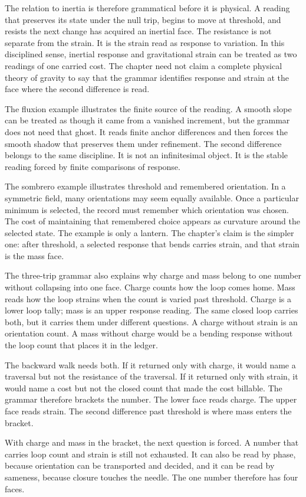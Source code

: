 The relation to inertia is therefore grammatical before it is physical. A
reading that preserves its state under the null trip, begins to move at
threshold, and resists the next change has acquired an inertial face. The
resistance is not separate from the strain. It is the strain read as response
to variation. In this disciplined sense, inertial response and gravitational
strain can be treated as two readings of one carried cost. The chapter need
not claim a complete physical theory of gravity to say that the grammar
identifies response and strain at the face where the second difference is
read.

The fluxion example illustrates the finite source of the reading. A smooth
slope can be treated as though it came from a vanished increment, but the
grammar does not need that ghost. It reads finite anchor differences and
then forces the smooth shadow that preserves them under refinement. The
second difference belongs to the same discipline. It is not an infinitesimal
object. It is the stable reading forced by finite comparisons of response.

The sombrero example illustrates threshold and remembered orientation. In a
symmetric field, many orientations may seem equally available. Once a
particular minimum is selected, the record must remember which orientation
was chosen. The cost of maintaining that remembered choice appears as
curvature around the selected state. The example is only a lantern. The
chapter's claim is the simpler one: after threshold, a selected response
that bends carries strain, and that strain is the mass face.

The three-trip grammar also explains why charge and mass belong to one
number without collapsing into one face. Charge counts how the loop comes
home. Mass reads how the loop strains when the count is varied past
threshold. Charge is a lower loop tally; mass is an upper response reading.
The same closed loop carries both, but it carries them under different
questions. A charge without strain is an orientation count. A mass without
charge would be a bending response without the loop count that places it in
the ledger.

The backward walk needs both. If it returned only with charge, it would name
a traversal but not the resistance of the traversal. If it returned only with
strain, it would name a cost but not the closed count that made the cost
billable. The grammar therefore brackets the number. The lower face reads
charge. The upper face reads strain. The second difference past threshold is
where mass enters the bracket.

With charge and mass in the bracket, the next question is forced. A number
that carries loop count and strain is still not exhausted. It can also be
read by phase, because orientation can be transported and decided, and it
can be read by sameness, because closure touches the needle. The one number
therefore has four faces.
